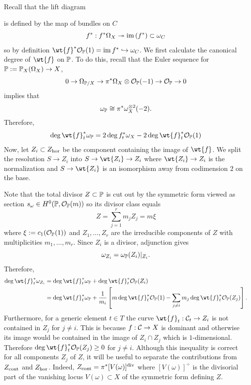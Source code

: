 \documentclass[main.tex]{subfiles}
\begin{document}
Recall that the lift diagram
\begin{center}
\end{center} 
is defined by the map of bundles on $C$ 
\[ f^* : f^* \Omega_X \onto \im{(f^*)} \subset \omega_C \]
so by definition $\wt{f}^* \cO_{\P}(1) = \im{f^*} \embed \omega_C$. We first calculate the canonical degree of $\wt{f}$ on $\P$. To do this, recall that the Euler sequence for $\P := \P_X(\Omega_X) \to X$,
\[ 0 \to \Omega_{\P/X} \to \pi^* \Omega_X \ot \cO_{\P}(-1) \to \cO_{\P} \to 0 \]
implies that
\[ \omega_{\P} \cong \pi^* \omega_{X}^{\ot 2}(-2). \]
Therefore, 
\begin{equation} \label{eq:total_space_canonical_degree}
\deg{\wt{f}_t^* \omega_{\P}} = 2 \deg{f_t^* \omega_X} - 2 \deg{\wt{f}_t^* \cO_{\P}(1)}
\end{equation}
Now, let $Z_i \subset \Zhor$ be the component containing the image of $\wt{f}$. We split the resolution $S \to Z_i$ into $S \to \wt{Z_i} \to Z_i$ where $\wt{Z_i} \to Z_i$ is the normalization and $S \to \wt{Z_i}$ is an isomorphism away from codimension $2$ on the base.
\par 
Note that the total divisor $Z \subset \P$ is cut out by the symmetric form viewed as section $s_{\omega} \in H^0(\P, \cO_{\P}(m))$ so its divisor class equals
\[ Z = \sum_{j = 1}^r m_j Z_j = m \xi \]
where $\xi := c_1(\cO_{\P}(1))$ and $Z_1, \dots, Z_r$ are the irreducible components of $Z$ with multiplicities $m_1, \dots, m_r$. Since $Z_i$ is a divisor, adjunction gives
\[ \omega_{Z_i} = \omega_{\P}(Z_i)|_{Z_i}. \]
Therefore,
\begin{align*}
\deg{\wt{f}_t^* \omega_{Z_i}} & = \deg{\wt{f}_t^* \omega_{\P}} + \deg{\wt{f}_t^* \cO_{\P}(Z_i)}
\\
& = \deg{\wt{f}_t^* \omega_{\P}} + \frac{1}{m_i} \left[ m \deg{\wt{f}_t^* \cO_{\P}(1)} - \sum_{j \neq i} m_j \deg{\wt{f}_t^* \cO_{\P}(Z_j)} \right].
\end{align*}
Furthermore, for a generic element $t \in T$ the curve $\wt{f}_t : \cC_t \to Z_i$ is not contained in $Z_j$ for $j \neq i$. This is because $f : \cC \to X$ is dominant and otherwise its image would be contained in the image of $Z_i \cap Z_j$ which is $1$-dimensional. Therefore $\deg{\wt{f}_t^* \cO_{\P}(Z_j)} \ge 0$ for $j \neq i$. Although this inequality is correct for all components $Z_j$ of $Z$, it will be useful to separate the contributions from $\Zcont$ and $\Zhor$. Indeed, $\Zcont = \pi^* [V(\omega)]^{\div}$ where $[V(\omega)]^{\div}$ is the divisorial part of the vanishing locus $V(\omega) \subset X$ of the symmetric form defining $Z$. 
\end{document}
